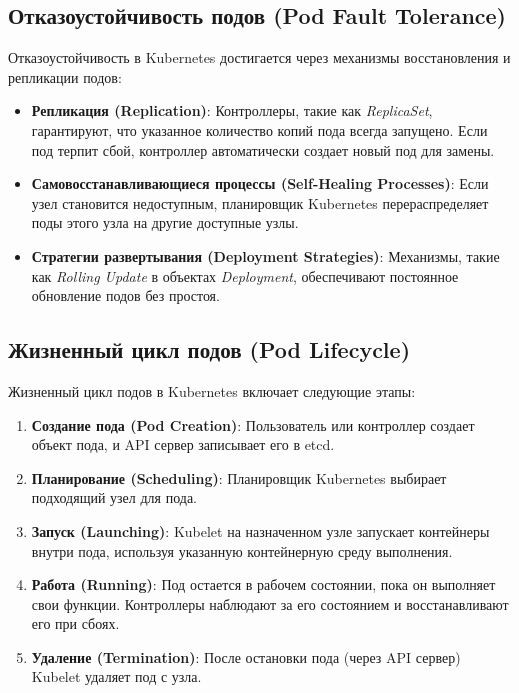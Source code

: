 \subsection*{Отказоустойчивость подов (Pod Fault Tolerance)}

Отказоустойчивость в Kubernetes достигается через механизмы восстановления и
репликации подов:

\begin{itemize}
   \item \textbf{Репликация (Replication)}: Контроллеры, такие как
\textit{ReplicaSet}, гарантируют, что указанное количество копий пода всегда
запущено. Если под терпит сбой, контроллер автоматически создает новый под для
замены.
   \item \textbf{Самовосстанавливающиеся процессы (Self-Healing Processes)}: Если узел
становится недоступным, планировщик Kubernetes перераспределяет поды этого узла
на другие доступные узлы.
   \item \textbf{Стратегии развертывания (Deployment Strategies)}: Механизмы,
такие как \textit{Rolling Update} в объектах \textit{Deployment}, обеспечивают
постоянное обновление подов без простоя.
\end{itemize}

\subsection*{Жизненный цикл подов (Pod Lifecycle)}

Жизненный цикл подов в Kubernetes включает следующие этапы:

\begin{enumerate}
   \item \textbf{Создание пода (Pod Creation)}: Пользователь или контроллер
создает объект пода, и API сервер записывает его в etcd.
   \item \textbf{Планирование (Scheduling)}: Планировщик Kubernetes выбирает
подходящий узел для пода.
   \item \textbf{Запуск (Launching)}: Kubelet на назначенном узле запускает
контейнеры внутри пода, используя указанную контейнерную среду выполнения.
   \item \textbf{Работа (Running)}: Под остается в рабочем состоянии, пока он
выполняет свои функции. Контроллеры наблюдают за его состоянием и
восстанавливают его при сбоях.
   \item \textbf{Удаление (Termination)}: После остановки пода (через API
сервер) Kubelet удаляет под с узла.
\end{enumerate}


